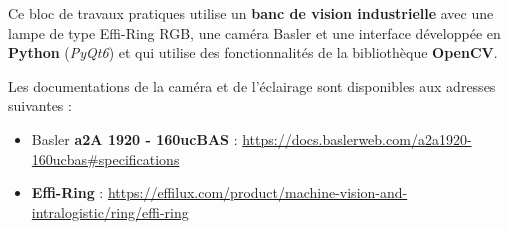 \documentclass[a4paper,11pt,titlepage]{article} %
\begin{document}
\newpage
\strut %

\vfill

Ce bloc de travaux pratiques utilise un \textbf{banc de vision industrielle} avec une lampe de type Effi-Ring RGB, une caméra Basler et une interface développée en \textbf{Python} (\textit{PyQt6}) et qui utilise des fonctionnalités de la bibliothèque \textbf{OpenCV}.

Les documentations de la caméra et de l'éclairage sont disponibles aux adresses suivantes : 

\begin{itemize}
	\item Basler \textbf{a2A 1920 - 160ucBAS} : \href{https://docs.baslerweb.com/a2a1920-160ucbas#specifications}{https://docs.baslerweb.com/a2a1920-160ucbas\#specifications}
	\item \textbf{Effi-Ring} : \href{https://effilux.com/product/machine-vision-and-intralogistic/ring/effi-ring}{https://effilux.com/product/machine-vision-and-intralogistic/ring/effi-ring}
\end{itemize}

\newpage
\pagestyle{empty}





\end{document}
